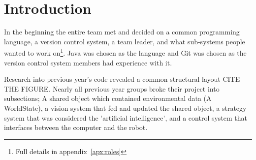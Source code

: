 \section{Introduction}

In the beginning the entire team met and decided on a common programming language,
a version control system, a team leader, and what sub-systems people
wanted to work on\footnote{Full details in appendix~\ref{apx:roles}}. Java was
chosen as the language and Git was chosen as the version control system
members had experience with it.

Research into previous year's code revealed a common structural layout CITE THE
FIGURE.  Nearly all previous year groups broke their project into subsections;
A shared object which contained environmental data (A WorldState), a vision
system that fed and updated the shared object, a strategy system that was
considered the 'artificial intelligence', and a control system that interfaces between the
computer and the robot. 
